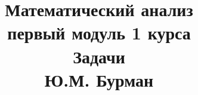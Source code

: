 \documentclass[fleqn]{article}
\title{Математический анализ \\ первый модуль 1 курса \\ Задачи \\ Ю.М. Бурман}
\begin{document}
	\maketitle
	\pagebreak
	
	\tableofcontents
	
	\newpage
	
	
		
\end{document}
